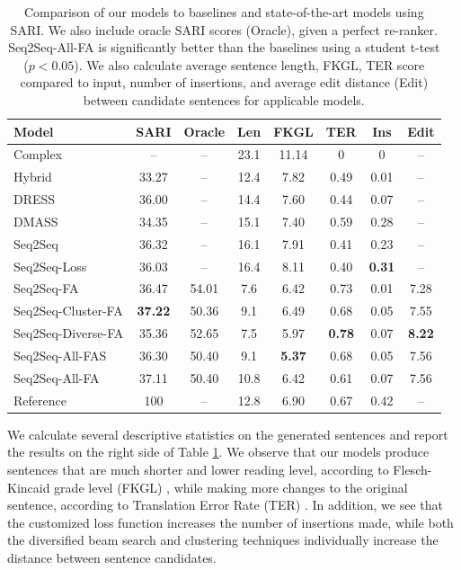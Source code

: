 \documentclass[thesis.tex]{subfiles}
\begin{document}
\begin{table}
\begin{center}
\small
\begin{tabular}{|l|cc|ccccc|} \hline
\textbf{Model} & \textbf{SARI} & Oracle & \textbf{Len} & \textbf{FKGL} & \textbf{TER} & \textbf{Ins} & \textbf{Edit}\\ \hline
Complex & -- & -- & 23.1 & 11.14 & 0 & 0 & -- \\ \hline
Hybrid & 33.27 & -- & 12.4 & 7.82 & 0.49 & 0.01 & --\\
DRESS & 36.00 & -- & 14.4 & 7.60 & 0.44 & 0.07 & --\\ 
DMASS & 34.35 & -- & 15.1 & 7.40 & 0.59 & 0.28 & -- \\ \hline
Seq2Seq & 36.32 & -- & 16.1 & 7.91 & 0.41 & 0.23 & -- \\
Seq2Seq-Loss & 36.03 & -- & 16.4 & 8.11 & 0.40 & \textbf{0.31} & --\\
Seq2Seq-FA & 36.47 & 54.01 & 7.6 & 6.42 & 0.73 & 0.01 & 7.28 \\
{\scriptsize Seq2Seq-Cluster-FA} & \textbf{37.22} & 50.36 & 9.1 & 6.49 & 0.68 & 0.05 & 7.55 \\
{\scriptsize Seq2Seq-Diverse-FA} & 35.36 & 52.65 & 7.5 & 5.97 & \textbf{0.78} & 0.07 & \textbf{8.22} \\
Seq2Seq-All-FAS & 36.30 & 50.40 & 9.1 & \textbf{5.37} & 0.68 & 0.05 & 7.56 \\
Seq2Seq-All-FA & 37.11 & 50.40 & 10.8 & 6.42 & 0.61 & 0.07 & 7.56 \\ \hline
Reference & 100 & -- & 12.8 & 6.90 & 0.67 & 0.42 & --\\
\hline
\end{tabular}
\end{center}
\caption{\label{tab:sent_auto} Comparison of our models to baselines and state-of-the-art models using SARI. We also include oracle SARI scores (Oracle), given a perfect re-ranker. Seq2Seq-All-FA is significantly better than the baselines using a student t-test ($p < 0.05$). We also calculate average sentence length, FKGL, TER score compared to input, number of insertions, and average edit distance (Edit) between candidate sentences for applicable models.}
\end{table}

We calculate several descriptive statistics on the generated sentences and report the results on the right side of Table \ref{tab:sent_auto}. We observe that our models produce sentences that are much shorter and lower reading level, according to Flesch-Kincaid grade level (FKGL) \citep{kincaid1975derivation}, while making more changes to the original sentence, according to Translation Error Rate (TER) \citep{snover2006study}. In addition, we see that the customized loss function increases the number of insertions made, while both the diversified beam search and clustering techniques individually increase the distance between sentence candidates.
\end{document}
